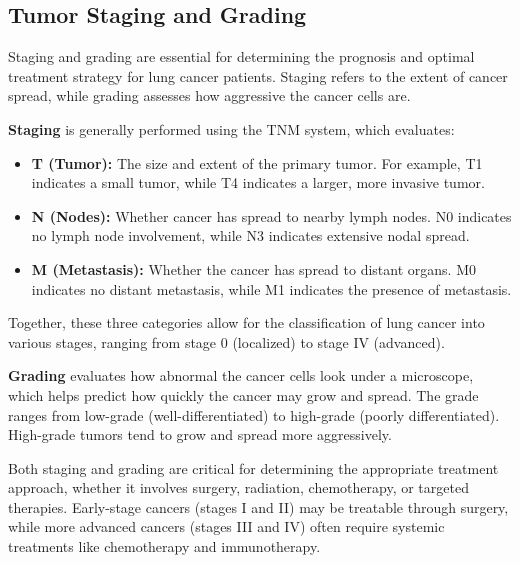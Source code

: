 \subsection{Tumor Staging and Grading}

Staging and grading are essential for determining the prognosis and optimal treatment strategy for 
lung cancer patients. Staging refers to the extent of cancer spread, while grading assesses how 
aggressive the cancer cells are.

\textbf{Staging} is generally performed using the TNM system, which evaluates:

\begin{itemize}
    \item \textbf{T (Tumor):} The size and extent of the primary tumor. For example, T1 indicates a 
    small tumor, while T4 indicates a larger, more invasive tumor.

    \item \textbf{N (Nodes):} Whether cancer has spread to nearby lymph nodes. N0 indicates no lymph 
    node involvement, while N3 indicates extensive nodal spread.

    \item \textbf{M (Metastasis):} Whether the cancer has spread to distant organs. M0 indicates no 
    distant metastasis, while M1 indicates the presence of metastasis.
\end{itemize}

Together, these three categories allow for the classification of lung cancer into various stages, 
ranging from stage 0 (localized) to stage IV (advanced).

\textbf{Grading} evaluates how abnormal the cancer cells look under a microscope, which helps predict 
how quickly the cancer may grow and spread. The grade ranges from low-grade (well-differentiated) 
to high-grade (poorly differentiated). High-grade tumors tend to grow and spread more aggressively.

Both staging and grading are critical for determining the appropriate treatment approach, whether it 
involves surgery, radiation, chemotherapy, or targeted therapies. Early-stage cancers (stages I and 
II) may be treatable through surgery, while more advanced cancers (stages III and IV) often require 
systemic treatments like chemotherapy and immunotherapy.

